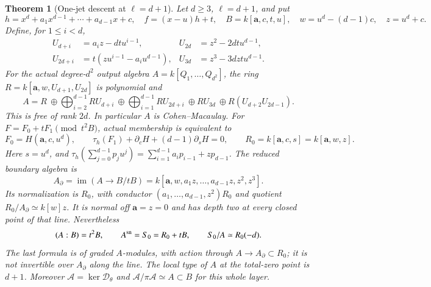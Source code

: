 \documentclass[10pt,fleqn]{article}
\numberwithin{equation}{section}
\newtheorem{theorem}{Theorem}[section]
\begin{document}
\begin{theorem}[One-jet descent at $\ell=d+1$]
\label{v8r9:mixed:first-excluded}
Let $d\ge3$, $\ell=d+1$, and put
\[
 h=x^d+a_1x^{d-1}+\cdots+a_{d-1}x+c,\quad f=(x-u)h+t,
 \quad B=k[\mathbf a,c,t,u],\quad w=u^d-(d-1)c,\quad z=u^d+c.
\]
Define, for $1\le i<d$,
\[
 \begin{aligned}
 U_{d+i}&=a_i z-dtu^{i-1},& U_{2d}&=z^2-2dtu^{d-1},\\
 U_{2d+i}&=t(zu^{i-1}-a_i u^{d-1}),& U_{3d}&=z^3-3dztu^{d-1}.
 \end{aligned}
\]
For the actual degree-$d^2$ output algebra $A=k[Q_1,\ldots,Q_{d^2}]$,
the ring $R=k[\mathbf a,w,U_{d+1},U_{2d}]$ is polynomial and
\[
 A=R\ \oplus\!\bigoplus_{i=2}^{d-1}RU_{d+i}
       \ \oplus\!\bigoplus_{i=1}^{d-1}RU_{2d+i}
       \ \oplus RU_{3d}\ \oplus R(U_{d+2}U_{2d-1}).
\]
This is free of rank $2d$.  In particular $A$ is Cohen--Macaulay.
For $F=F_0+tF_1\pmod{t^2B}$, actual membership is equivalent to
\[
 F_0=H(\mathbf a,c,u^d),\qquad
 \tau_h(F_1)+\partial_cH+(d-1)\partial_sH=0,
 \qquad R_0=k[\mathbf a,c,s]=k[\mathbf a,w,z].
\]
Here $s=u^d$, and
$\tau_h(\sum_{j=0}^{d-1}p_ju^j)=\sum_{i=1}^{d-1}a_i p_{i-1}+zp_{d-1}$.
The reduced boundary algebra is
\[
 A_\partial=\operatorname{im}(A\to B/tB)
   =k[\mathbf a,w,a_1z,\ldots,a_{d-1}z,z^2,z^3].
\]
Its normalization is $R_0$, with conductor
$(a_1,\ldots,a_{d-1},z^2)R_0$ and quotient $R_0/A_\partial\simeq k[w]z$.
It is normal off $\mathbf a=z=0$ and has depth two at every closed point
of that line.  Nevertheless
\[
 (A:B)=t^2B,\qquad A^{\rm sn}=S_0=R_0+tB,\qquad S_0/A\simeq R_0(-d).
\]
The last formula is of graded $A$-modules, with action through
$A\to A_\partial\subset R_0$; it is not invertible over $A_\partial$
along the line.  The local type of $A$ at the total-zero point is $d+1$.
Moreover $\mathscr A=\ker\mathscr D_\theta$ and
$\mathscr A/\pi\mathscr A\simeq A\subset B$ for this whole layer.
\end{theorem}
\end{document}
